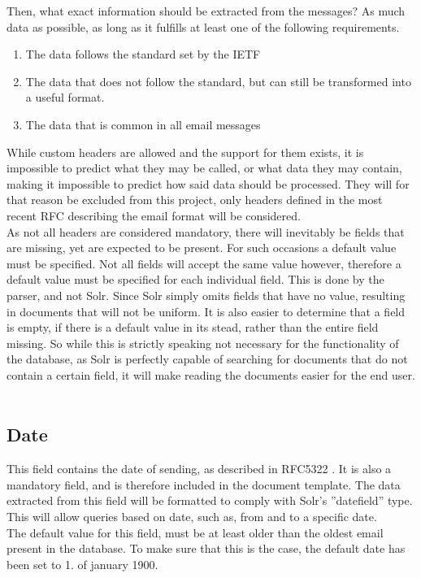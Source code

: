 \documentclass[a4paper,english]{report}
\begin{document}
Then, what exact information should be extracted from the messages?
As much data as possible, as long as it fulfills at least one of the following requirements.

\begin{enumerate}

\item The data follows the standard set by the IETF

\item The data that does not follow the standard, but can still be transformed into a useful format. 

\item The data that is common in all email messages


\end{enumerate}



While custom headers are allowed and the support for them exists, it is impossible to predict what they may be called, or what data they may contain, making it impossible to predict how said data should be processed. They will for that reason be excluded from this project, only headers defined in the most recent RFC describing the email format will be considered.
\\
As not all headers are considered mandatory, there will inevitably be fields that are missing, yet are expected to be present. For such occasions a default value must be specified. Not all fields will accept the same value however, therefore a default value must be specified for each individual field. This is done by the parser, and not Solr. Since Solr simply omits fields that have no value, resulting in documents that will not be uniform.
It is also easier to determine that a field is empty, if there is a default value in its stead, rather than the entire field missing. So while this is strictly speaking not necessary for the functionality of the database, as Solr is perfectly capable of searching for documents that do not contain a certain field, it will make reading the documents easier for the end user.\\\\



\noindent
\subsection{Date}
This field contains the date of sending, as described in RFC5322 \cite{RFC5322}. It is also a mandatory field, and is therefore included in the document template. The data extracted from this field will be formatted to comply with Solr's ”datefield” type. This will allow queries based on date, such as, from and to a specific date.
\\
The default value for this field, must be at least older than the oldest email present in the database. To make sure that this is the case, the default date has been set to 1. of january 1900.
\end{document}
